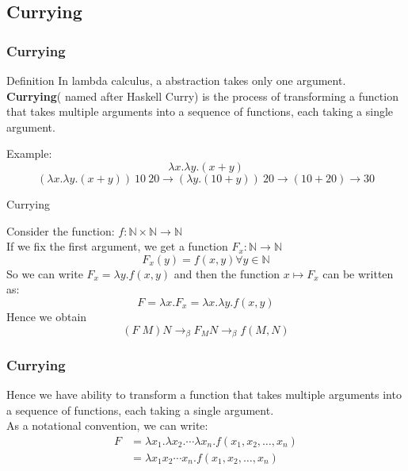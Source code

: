 \documentclass{beamer}
\begin{document}
\subsection{Currying}
\begin{frame}
  \frametitle{Currying}
  \begin{block}{Definition}
    In lambda calculus, a abstraction takes only one argument.\\
    \textbf{Currying}( named after Haskell Curry) is the process of transforming a function that takes multiple arguments into a sequence of functions, each taking a single argument.
  \end{block}
  Example:
  \[
  \lambda x.\lambda y.(x+y)
  \]
  \[
  (\lambda x.\lambda y.(x+y))\ 10\ 20 \rightarrow (\lambda y.(10+y))\ 20 \rightarrow (10+20) \rightarrow 30
  \]
\end{frame}

\begin{frame}{Currying}

  Consider the function: \(f:\mathbb{N}\times\mathbb{N} \rightarrow \mathbb{N}\) \\
  If we fix the first argument, we get a function \(F_x:\mathbb{N} \rightarrow \mathbb{N}\)\\
  \[
    F_x(y) = f(x,y) \forall y \in \mathbb{N}
  \]  
  So we can write \(F_x = \lambda y.f(x,y)\)
  and then the function \(x \mapsto F_x\) can be written as:
  \[
    F = \lambda x.F_x = \lambda x.\lambda y.f(x,y)
  \]
  Hence we obtain 
  \[
    (F\;M)N \rightarrow_\beta F_M N \rightarrow_\beta f(M,N)
  \]
\end{frame}
\begin{frame}
  \frametitle{Currying}

  Hence we have ability to transform a function that takes multiple arguments into a sequence of functions, each taking a single argument.\\
  As a notational convention, we can write:
  \[
  \begin{aligned}
      F &= \lambda x_1.\lambda x_2.\cdots\lambda x_n.f(x_1,x_2,\ldots,x_n) \\ 
        &= \lambda x_1 x_2 \cdots x_n. f(x_1,x_2,\ldots,x_n)
  \end{aligned}
  \]
\end{frame}
\end{document}
